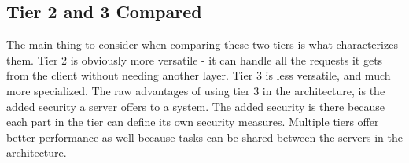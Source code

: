 \subsection{Tier 2 and 3 Compared}

The main thing to consider when comparing these two tiers is what characterizes them. Tier 2 
is obviously more versatile - it can handle all the requests it gets from the client without 
needing another layer. Tier 3 is less versatile, and much more 
specialized. The raw advantages of using tier 3 in the architecture, is the added security a server 
offers to a system. The added security is there because each part in the tier can define 
its own security measures. Multiple tiers offer better performance 
as well because tasks can be shared between the servers in the 
architecture\cite{tierserverclient08}.
